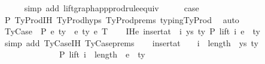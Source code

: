 \begin{isabellebody}
\ \ \ \ \isamarkupfalse%
\ {\isacharparenleft}{\kern0pt}simp\ add{\isacharcolon}{\kern0pt}\ lift{\isacharunderscore}{\kern0pt}graph{\isacharunderscore}{\kern0pt}app{\isacharunderscore}{\kern0pt}prodrule{\isacharunderscore}{\kern0pt}equiv{\isacharparenright}{\kern0pt}\isanewline
\isanewline
\ \ \isamarkupfalse%
\ \isamarkupfalse%
\ {\isacharquery}{\kern0pt}case\isanewline
\ \ \ \ \isamarkupfalse%
\ P{}\ TyProd{\isachardot}{\kern0pt}IH\ TyProd{\isachardot}{\kern0pt}hyps{\isacharparenleft}{\kern0pt}{}{\isacharcomma}{\kern0pt}{}{\isacharcomma}{\kern0pt}{}{\isacharcomma}{\kern0pt}{}{\isacharparenright}{\kern0pt}\ TyProd{\isachardot}{\kern0pt}prems\ typing{\isachardot}{\kern0pt}TyProd\ \isamarkupfalse%
\ auto\isanewline
{}\isamarkupfalse%
\isanewline
\ \ \isamarkupfalse%
\ {\isacharparenleft}{\kern0pt}TyCase\ {\isasymGamma}\ P\ e{}\ ty{}\ {\isasymGamma}{}\ e{}\ ty{}{\isacharprime}{\kern0pt}\ e{}\ T{\isacharparenright}{\kern0pt}\isanewline
\ \ \isamarkupfalse%
\ IHe{}{\isacharcolon}{\kern0pt}\ {\isachardoublequoteopen}insert{\isacharunderscore}{\kern0pt}at\ {\isasymGamma}\ i\ {\isacharparenleft}{\kern0pt}ys{\isacharcomma}{\kern0pt}\ ty{}{\isacharparenright}{\kern0pt}\ {\isasymturnstile}{\isacharbraceleft}{\kern0pt}P{\isacharbraceright}{\kern0pt}\ lift\ i\ e{}\ {\isacharcolon}{\kern0pt}\ ty{}{\isachardoublequoteclose}\isanewline
\ \ \ \ \isamarkupfalse%
\ {\isacharparenleft}{\kern0pt}simp\ add{\isacharcolon}{\kern0pt}\ TyCase{\isachardot}{\kern0pt}IH{\isacharparenleft}{\kern0pt}{}{\isacharparenright}{\kern0pt}\ TyCase{\isachardot}{\kern0pt}prems{\isacharparenright}{\kern0pt}\isanewline
\isanewline
\ \ \isamarkupfalse%
\ {\isachardoublequoteopen}insert{\isacharunderscore}{\kern0pt}at\ {\isacharparenleft}{\kern0pt}{\isasymGamma}{}\ {\isacharat}{\kern0pt}\ {\isasymGamma}{\isacharparenright}{\kern0pt}\ {\isacharparenleft}{\kern0pt}i\ {\isacharplus}{\kern0pt}\ length\ {\isasymGamma}{}{\isacharparenright}{\kern0pt}\ {\isacharparenleft}{\kern0pt}ys{\isacharcomma}{\kern0pt}\ ty{}{\isacharparenright}{\kern0pt}\isanewline
\ \ \ \ \ \ \ \ \ \ \ \ \ \ {\isasymturnstile}{\isacharbraceleft}{\kern0pt}P{\isacharbraceright}{\kern0pt}\ lift\ {\isacharparenleft}{\kern0pt}i\ {\isacharplus}{\kern0pt}\ length\ {\isasymGamma}{}{\isacharparenright}{\kern0pt}\ e{}\ {\isacharcolon}{\kern0pt}\ ty{}{\isacharprime}{\kern0pt}{\isachardoublequoteclose}\isanewline

\end{isabellebody}
